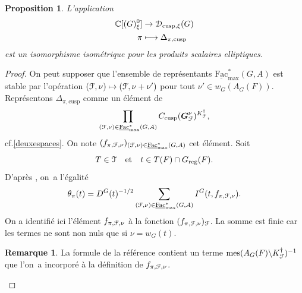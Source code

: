 \documentclass[11pt]{article}
\newcommand{\cf}{cf.\xspace}
\numberwithin{equation}{section}\providecommand{\og}{«\,}\providecommand{\fg}{\,»}
\let\mathcal \EuScript
\newcommand{\NoChangel}[1]{%
\expandafter\let\csname old\string#1\endcsname=#1
\let#1=\relax
\newcommand{#1}{\mathcode`l="716C\csname old\string#1\endcsname\mathcode`l="7160 }%
}
\newcommand{\quadet}{\quad\text{et}\quad}
\newcommand\mto{\mathchoice{\longmapsto}{\mapsto}{\mapsto}{\mapsto}}
\newcommand{\cusp}{\mathrm{cusp}}
\newcommand{\rell}{\mathrm{ell}} \NoChangel{\rell}
\newcommand{\Ell}{\mathrm{Ell}} \NoChangel{\Ell}
\newcommand{\Fac}{\mathrm{Fac}}
\newcommand{\reg}{\mathrm{reg}}
\DeclareMathOperator{\mes}{mes}
\newcommand{\bG}{\boldsymbol{G}}
\newcommand{\cD}{\mathcal{D}}
\newcommand{\cF}{\mathcal{F}}
\newcommand{\cT}{\mathcal{T}}
\newcommand{\CC}{\mathbb{C}}
\theoremstyle{plain}
\newtheorem*{prop*}{Proposition}
\theoremstyle{definition}
\newtheorem*{rem*}{Remarque}
\begin{document}
\begin{prop*}
L'application
\begin{align*}
\CC[\Ell(G)_{\xi}^0]&\to \cD_{\cusp,\xi}(G)\\
\pi&\mto \Delta_{\pi,\cusp}
\end{align*}
est un isomorphisme isométrique pour les produits scalaires elliptiques.
\end{prop*}

\begin{proof}
On peut supposer que l'ensemble de représentants $\underline{\Fac}^*_{\max}(G,A)$ est stable par l'opération $(\cF,\nu)\mto (\cF,\nu+\nu')$ pour tout $\nu'\in w_{G}(A_{G}(F))$. Représentons $\Delta_{\pi,\cusp}$ comme un élément de
\[
\prod_{(\cF,\nu)\in \underline{\Fac}^*_{\max}(G,A)}C_{\cusp}(\bG_{\cF}^{\nu})^{K_{\cF}^{\dag}},
\]
\cf \ref{deuxespaces}. On note $(f_{\pi,\cF,\nu})_{(\cF,\nu)\in \underline{\Fac}^*_{\max}(G,A)}$ cet élément.
Soit
\[
T\in \cT_{\rell}\quadet t\in T(F)\cap G_{\reg}(F).
\]
D'après \cite[18(3)]{W2}, on~a l'égalité
\[
\theta_{\pi}(t)=D^G(t)^{-1/2}\sum_{(\cF,\nu)\in \underline{\Fac}^*_{\max}(G,A)} I^G(t,f_{\pi,\cF,\nu}).
\]
On a identifié ici l'élément $f_{\pi,\cF,\nu}$ à la fonction $(f_{\pi,\cF,\nu})_{\cF}$. La somme est finie car les termes ne sont non nuls que si $\nu=w_{G}(t)$.

\begin{rem*}
La formule de la référence contient un terme $\mes(A_{G}(F)\backslash K_{\cF}^{\dag})^{-1}$ que l'on~a incorporé à la définition de $f_{\pi,\cF,\nu}$.
\end{rem*}


\end{proof}
\end{document}
